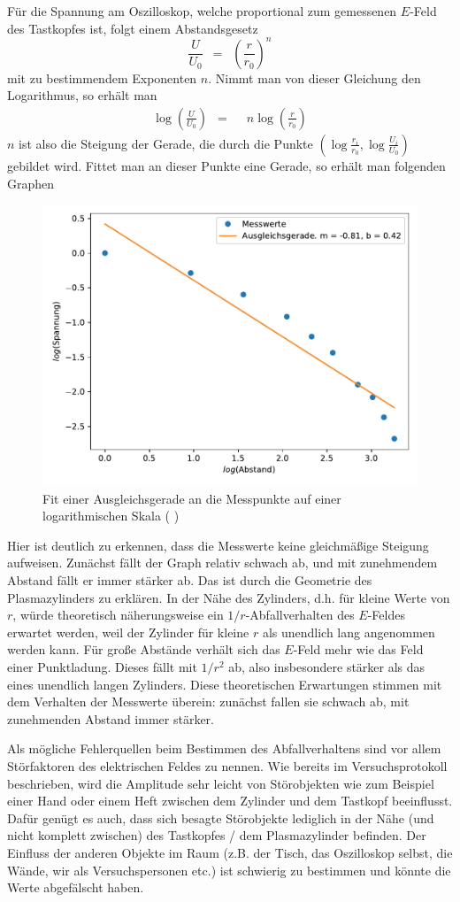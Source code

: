 \documentclass{article}
\newcommand{\widespace}{\enspace}
\newcommand{\wideeq}{\widespace = \widespace}
\newcommand{\coderef}[1]{%
    \text{\footnotesize \colorbox{codebg}{\texttt{#1()}}}%
}
\begin{document}
Für die Spannung am Oszilloskop, welche proportional zum gemessenen $E$-Feld
des Tastkopfes ist, folgt einem Abstandsgesetz
\[
    \frac{U}{U_0} \wideeq \left( \frac{r}{r_0} \right)^n
\]
mit zu bestimmendem Exponenten $n$.
Nimmt man von dieser Gleichung den Logarithmus, so erhält man
\begin{align*}
    \log \left( \frac{U}{U_0} \right) \wideeq& n \log \left( \frac{r}{r_0} \right)
\end{align*}
$n$ ist also die Steigung der Gerade, die durch die Punkte
$\left( \log \frac{r_i}{r_0}, \log \frac{U_i}{U_0} \right)$ gebildet wird.
Fittet man an dieser Punkte eine Gerade, so erhält man folgenden Graphen
\begin{figure}[H]
    \centering
    \includegraphics[width=0.7\linewidth]{Abbildungen/Graph_TV3.pdf}
    \caption{Fit einer Ausgleichsgerade an die Messpunkte auf einer logarithmischen
    Skala (\coderef{tv3})}
\end{figure}
Hier ist deutlich zu erkennen, dass die Messwerte keine gleichmäßige Steigung
aufweisen. Zunächst fällt der Graph relativ schwach ab, und mit zunehmendem
Abstand fällt er immer stärker ab.
Das ist durch die Geometrie des Plasmazylinders zu erklären.
In der Nähe des Zylinders, d.h. für kleine Werte von $r$, würde theoretisch
näherungsweise ein $1 / r$-Abfallverhalten des $E$-Feldes erwartet werden,
weil der Zylinder für kleine $r$ als unendlich lang angenommen werden kann.
Für große Abstände verhält sich das $E$-Feld mehr wie das Feld einer Punktladung.
Dieses fällt mit $1 / r^2$ ab, also insbesondere stärker als das eines unendlich
langen Zylinders.
Diese theoretischen Erwartungen stimmen mit dem Verhalten der Messwerte überein:
zunächst fallen sie schwach ab, mit zunehmenden Abstand immer stärker.

Als mögliche Fehlerquellen beim Bestimmen des Abfallverhaltens sind
vor allem Störfaktoren des elektrischen Feldes zu nennen. Wie bereits im
Versuchsprotokoll beschrieben, wird die Amplitude sehr leicht von Störobjekten
wie zum Beispiel einer Hand oder einem Heft zwischen dem Zylinder und dem Tastkopf
beeinflusst. Dafür genügt es auch, dass sich besagte Störobjekte lediglich
in der Nähe (und nicht komplett zwischen) des Tastkopfes / dem Plasmazylinder befinden.
Der Einfluss der anderen Objekte im Raum (z.B. der Tisch, das Oszilloskop selbst,
die Wände, wir als Versuchspersonen etc.) ist schwierig zu bestimmen und könnte
die Werte abgefälscht haben.
\end{document}
